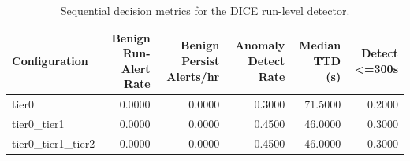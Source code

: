 \begin{table}[t]
\centering
\caption{Sequential decision metrics for the DICE run-level detector.}
\label{tab:dice_sequential_metrics}
\footnotesize
\begin{tabular}{lrrrrr}
\toprule
Configuration & Benign Run-Alert Rate & Benign Persist Alerts/hr & Anomaly Detect Rate & Median TTD (s) & Detect <=300s \\
\midrule
tier0 & 0.0000 & 0.0000 & 0.3000 & 71.5000 & 0.2000 \\
tier0_tier1 & 0.0000 & 0.0000 & 0.4500 & 46.0000 & 0.3000 \\
tier0_tier1_tier2 & 0.0000 & 0.0000 & 0.4500 & 46.0000 & 0.3000 \\
\bottomrule
\end{tabular}

\end{table}
